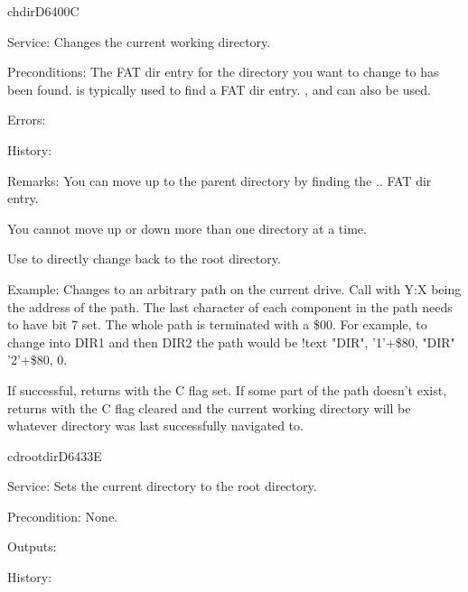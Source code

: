 \begin{hyppotrap}{chdir}{D640}{0C}
\item [Service:]
  Changes the current working directory.
\item [Preconditions:]
  The FAT dir entry for the directory you want to change to has been
  found.  is typically used to find a FAT dir entry.
  ,  and  can also be
  used.
\item [Errors:]
\item [History:]
\item [Remarks:]
  You can move up to the parent directory by finding the .. FAT dir entry.

  You cannot move up or down more than one directory at a time.

  Use  to directly change back to the root directory.
\item [Example:]
  Changes to an arbitrary path on the current drive. Call with Y:X being the
  address of the path. The last character of each component in the path needs
  to have bit 7 set. The whole path is terminated with a \$00. For example,
  to change into DIR1 and then DIR2 the path would be
  {\codefont !text "DIR", '1'+\$80, "DIR" '2'+\$80, 0}.

  If successful, returns with the C flag set. If some part of the path doesn't
  exist, returns with the C flag cleared and the current working directory will
  be whatever directory was last successfully navigated to.
\end{hyppotrap}

\newpage
\begin{hyppotrap}{cdrootdir}{D643}{3E}
\item [Service:]
  Sets the current directory to the root directory.
\item [Precondition:]
  None.
\item [Outputs:]
\item [History:]
\end{hyppotrap}

